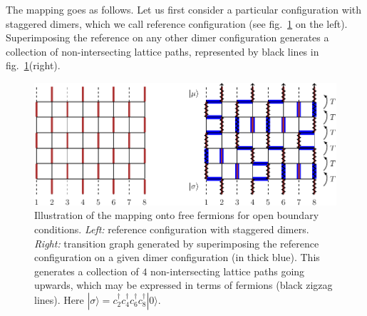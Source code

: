 \documentclass[11pt]{iopart}
\begin{document}
The mapping goes as follows. Let us first consider a particular configuration with staggered dimers, which we call reference configuration (see fig.~\ref{fig:freefermions} on the left). Superimposing the reference on any other dimer configuration generates a collection of non-intersecting lattice paths, represented by black lines in fig.~\ref{fig:freefermions}(right). 
\begin{figure}[ht]
\begin{center}
\includegraphics{./figures/free_fermions.pdf}
  \end{center}
  \caption{Illustration of the mapping onto free fermions for open boundary conditions. \emph{Left:} reference configuration with staggered dimers. \emph{Right:} transition graph generated by superimposing the reference configuration on a given dimer configuration (in thick blue). This generates a collection of $4$ non-intersecting lattice paths going upwards, which may be expressed in terms of fermions (black zigzag lines). Here $|\sigma\rangle=c_2^\dag c_4^\dag c_6^\dag c_8^\dag|0\rangle$.}
  \label{fig:freefermions}
  \end{figure}
\end{document}
